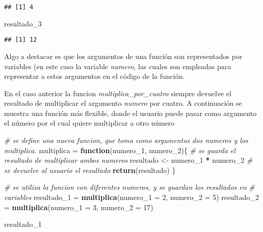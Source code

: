 \documentclass[]{article}
\newenvironment{Shaded}{\begin{snugshade}}{\end{snugshade}}
\newcommand{\CommentTok}[1]{\textcolor[rgb]{0.56,0.35,0.01}{\textit{#1}}}
\newcommand{\ControlFlowTok}[1]{\textcolor[rgb]{0.13,0.29,0.53}{\textbf{#1}}}
\newcommand{\DataTypeTok}[1]{\textcolor[rgb]{0.13,0.29,0.53}{#1}}
\newcommand{\DecValTok}[1]{\textcolor[rgb]{0.00,0.00,0.81}{#1}}
\newcommand{\KeywordTok}[1]{\textcolor[rgb]{0.13,0.29,0.53}{\textbf{#1}}}
\newcommand{\NormalTok}[1]{#1}
\newcommand{\OperatorTok}[1]{\textcolor[rgb]{0.81,0.36,0.00}{\textbf{#1}}}
\newcommand{\StringTok}[1]{\textcolor[rgb]{0.31,0.60,0.02}{#1}}
\begin{document}
\begin{verbatim}
## [1] 4
\end{verbatim}

\begin{Shaded}
\begin{Highlighting}[]
\NormalTok{    resultado_}\DecValTok{3}
\end{Highlighting}
\end{Shaded}

\begin{verbatim}
## [1] 12
\end{verbatim}

Algo a destacar es que los argumentos de una función son representados
por variables (en este caso la variable \emph{numero}, las cuales son
empleadas para representar a estos argumentos en el código de la
función.

En el caso anterior la funcion \emph{multiplica\_por\_cuatro} siempre
devuelve el resultado de multiplicar el argumento \emph{numero} por
cuatro. A continuación se muestra una función más flexible, donde el
usuario puede pasar como argumento el número por el cual quiere
multiplicar a otro número

\begin{Shaded}
\begin{Highlighting}[]
    \CommentTok{# se define una nueva funcion, que toma como argumentos dos numeros y los multiplica.}
\NormalTok{    multiplica =}\StringTok{ }\ControlFlowTok{function}\NormalTok{(numero_}\DecValTok{1}\NormalTok{, numero_}\DecValTok{2}\NormalTok{)\{}
    \CommentTok{# se guarda el resultado de multiplicar ambos numeros}
\NormalTok{    resultado <-}\StringTok{ }\NormalTok{numero_}\DecValTok{1} \OperatorTok{*}\StringTok{ }\NormalTok{numero_}\DecValTok{2}
    \CommentTok{# se devuelve al usuario el resultado}
    \KeywordTok{return}\NormalTok{(resultado)}
\NormalTok{    \}}
    
    \CommentTok{# se utiliza la funcion con diferentes numeros, y se guardan los resultados en }
    \CommentTok{# variables}
\NormalTok{    resultado_}\DecValTok{1}\NormalTok{ =}\StringTok{ }\KeywordTok{multiplica}\NormalTok{(}\DataTypeTok{numero_1 =} \DecValTok{2}\NormalTok{, }\DataTypeTok{numero_2 =} \DecValTok{5}\NormalTok{)}
\NormalTok{    resultado_}\DecValTok{2}\NormalTok{ =}\StringTok{ }\KeywordTok{multiplica}\NormalTok{(}\DataTypeTok{numero_1 =} \DecValTok{3}\NormalTok{, }\DataTypeTok{numero_2 =} \DecValTok{17}\NormalTok{)}
    
\NormalTok{    resultado_}\DecValTok{1}
\end{Highlighting}
\end{Shaded}
\end{document}
